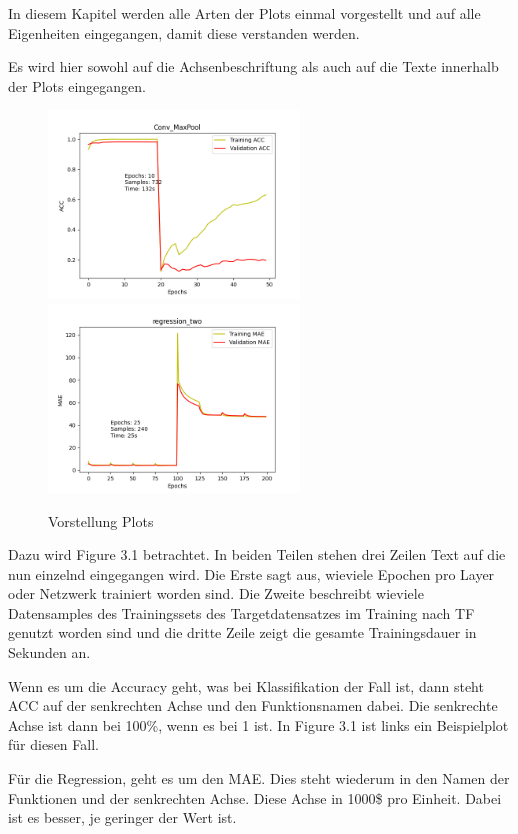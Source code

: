 In diesem Kapitel werden alle Arten der Plots einmal vorgestellt und auf alle Eigenheiten eingegangen, damit diese verstanden werden. 

Es wird hier sowohl auf die Achsenbeschriftung als auch auf die Texte innerhalb der Plots eingegangen. 

\begin{figure}[htpb]
    \includegraphics[height=5cm]{../../Plots/ba_plots/convmaxpool/2TFtr.png}
    \includegraphics[height=5cm]{../../Plots/ba_plots/regr2/regr2train.png}
    \caption{\label{fig:ploterkl} Vorstellung Plots}
\end{figure}

Dazu wird Figure 3.1 betrachtet. In beiden Teilen stehen drei Zeilen Text auf die nun einzelnd eingegangen wird. Die Erste sagt aus, 
wieviele Epochen pro Layer oder Netzwerk trainiert worden sind. Die Zweite beschreibt wieviele Datensamples des Trainingssets des 
Targetdatensatzes im Training nach TF genutzt worden sind und die dritte Zeile zeigt die gesamte Trainingsdauer in Sekunden an. 

Wenn es um die Accuracy geht, was bei Klassifikation der Fall ist, dann steht ACC auf der senkrechten Achse und den Funktionsnamen dabei. 
Die senkrechte Achse ist dann bei 100\%, wenn es bei 1 ist. In Figure 3.1 ist links ein Beispielplot für diesen Fall. 

Für die Regression, geht es um den MAE. Dies steht wiederum in den Namen der Funktionen und der senkrechten Achse. Diese Achse in 1000\$ pro 
Einheit. Dabei ist es besser, je geringer der Wert ist. 
